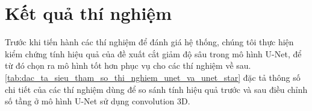 \section{Kết quả thí nghiệm} 
\label{sec:ket_qua_thi_nghiem}
	Trước khi tiến hành các thí nghiệm để đánh giá hệ thống, chúng tôi thực hiện kiểm chứng tính hiệu quả của đề xuất cắt giảm độ sâu trong mô hình U-Net, để từ đó chọn ra mô hình tốt hơn phục vụ cho các thí nghiệm về sau. \autoref{tab:dac_ta_sieu_tham_so_thi_nghiem_unet_va_unet_star} đặc tả thông số chi tiết của các thí nghiệm dùng để so sánh tính hiệu quả trước và sau điều chỉnh số tầng ở mô hình U-Net sử dụng convolution 3D.
	\begin{table}[h!]
		\caption{Thông số các thí nghiệm so sánh tính hiệu quả trước và sau điều chỉnh số tầng ở mô hình U-Net sử dụng convolution 3D.}
		\label{tab:dac_ta_sieu_tham_so_thi_nghiem_unet_va_unet_star}
	\end{table}


